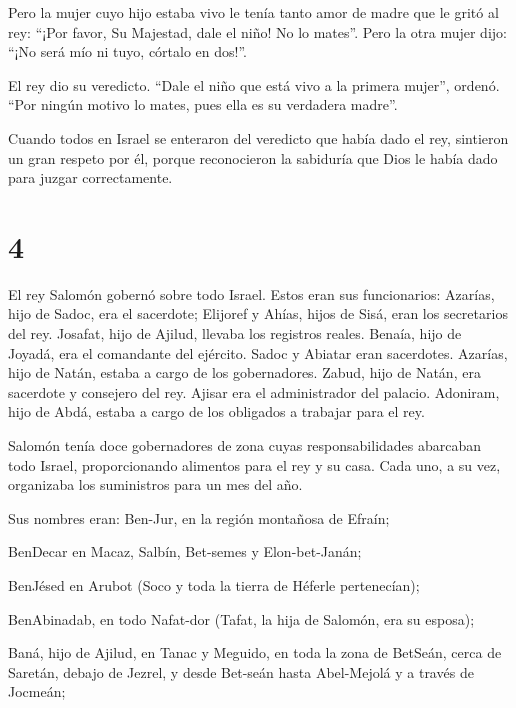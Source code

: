  Pero la mujer cuyo hijo estaba vivo le tenía tanto amor de
madre que le gritó al rey: ``¡Por favor, Su Majestad, dale el niño! No
lo mates''. Pero la otra mujer dijo: ``¡No será mío ni tuyo, córtalo en
dos!''.

 El rey dio su veredicto. ``Dale el niño que está vivo a la
primera mujer'', ordenó. ``Por ningún motivo lo mates, pues ella es su
verdadera madre''.

 Cuando todos en Israel se enteraron del veredicto que
había dado el rey, sintieron un gran respeto por él, porque reconocieron
la sabiduría que Dios le había dado para juzgar correctamente.

\hypertarget{section-3}{%
\section{4}\label{section-3}}

 El rey Salomón gobernó sobre todo Israel. 
Estos eran sus funcionarios: Azarías, hijo de Sadoc, era el sacerdote;
 Elijoref y Ahías, hijos de Sisá, eran los secretarios del
rey. Josafat, hijo de Ajilud, llevaba los registros reales. 
Benaía, hijo de Joyadá, era el comandante del ejército. Sadoc y Abiatar
eran sacerdotes.  Azarías, hijo de Natán, estaba a cargo de
los gobernadores. Zabud, hijo de Natán, era sacerdote y consejero del
rey.  Ajisar era el administrador del palacio. Adoniram,
hijo de Abdá, estaba a cargo de los obligados a trabajar para el rey.

 Salomón tenía doce gobernadores de zona cuyas
responsabilidades abarcaban todo Israel, proporcionando alimentos para
el rey y su casa. Cada uno, a su vez, organizaba los suministros para un
mes del año.

 Sus nombres eran: Ben-Jur, en la región montañosa de
Efraín;

 BenDecar en Macaz, Salbín, Bet-semes y Elon-bet-Janán;

 BenJésed en Arubot (Soco y toda la tierra de Héferle
pertenecían);

 BenAbinadab, en todo Nafat-dor (Tafat, la hija de Salomón,
era su esposa);

 Baná, hijo de Ajilud, en Tanac y Meguido, en toda la zona
de BetSeán, cerca de Saretán, debajo de Jezrel, y desde Bet-seán hasta
Abel-Mejolá y a través de Jocmeán;


